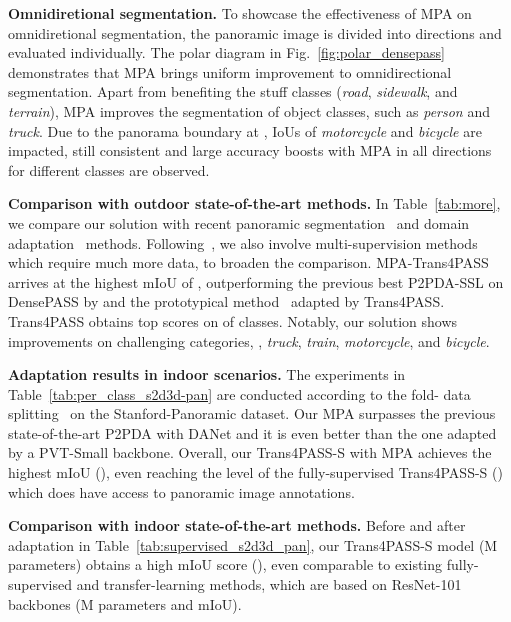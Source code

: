 \documentclass[final]{cvpr}
\begin{document}
\noindent\textbf{Omnidiretional segmentation.}
To showcase the effectiveness of MPA on omnidiretional segmentation, the panoramic image is divided into  directions and evaluated individually.
The polar diagram in Fig.~\ref{fig:polar_densepass} demonstrates that MPA brings uniform improvement to omnidirectional segmentation. Apart from benefiting the stuff classes (\emph{road}, \emph{sidewalk}, and \emph{terrain}), MPA improves the segmentation of object classes, such as \emph{person} and \emph{truck}. Due to the panorama boundary at , IoUs of \emph{motorcycle} and \emph{bicycle} are impacted, still consistent and large accuracy boosts with MPA in all directions for different classes are observed. 

\noindent\textbf{Comparison with outdoor state-of-the-art methods.}
In Table~\ref{tab:more},
we compare our solution with recent panoramic segmentation~\cite{pass,omnirange} and domain adaptation~\cite{clan,wang2020differential,yue2021pcs,p2pda_trans,crst} methods. Following~\cite{p2pda_trans}, we also involve multi-supervision methods~\cite{usss,seamless,issafe} which require much more data, to broaden the comparison.
MPA-Trans4PASS arrives at the highest mIoU of , outperforming the previous best P2PDA-SSL on DensePASS by  and the prototypical method~\cite{yue2021pcs} adapted by Trans4PASS. Trans4PASS obtains top scores on  of  classes.
Notably, our solution shows improvements on challenging categories, \eg, \emph{truck}, \emph{train}, \emph{motorcycle}, and \emph{bicycle}.

\noindent\textbf{Adaptation results in indoor scenarios.}
The experiments in Table~\ref{tab:per_class_s2d3d-pan} are conducted according to the fold- data splitting~\cite{stanford2d3d} on the Stanford-Panoramic dataset. Our MPA surpasses the previous state-of-the-art P2PDA with DANet and it is even better than the one adapted by a PVT-Small backbone.
Overall, our Trans4PASS-S with MPA achieves the highest mIoU (), even reaching the level of the fully-supervised Trans4PASS-S () which does have access to panoramic image annotations.

\noindent\textbf{Comparison with indoor state-of-the-art methods.}
Before and after adaptation in Table~\ref{tab:supervised_s2d3d_pan}, our Trans4PASS-S model (M parameters) obtains a high mIoU score (), even comparable to existing fully-supervised and transfer-learning methods, which are based on ResNet-101 backbones (M parameters and  mIoU).
\end{document}
